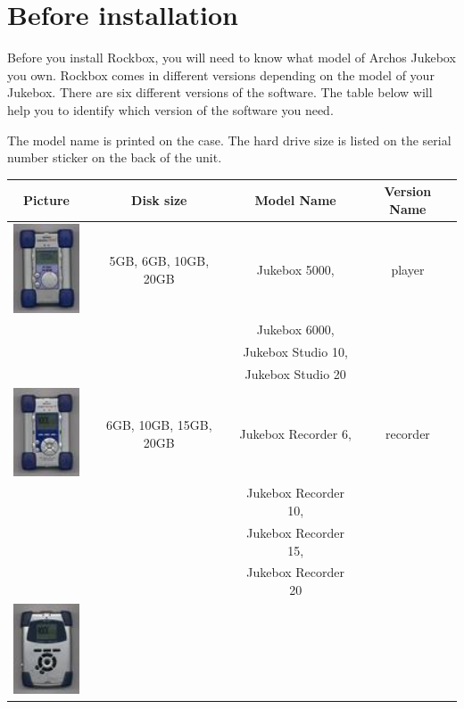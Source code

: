 \section{Before installation}

Before you install Rockbox, you will need to know what model of Archos
Jukebox you own.  Rockbox comes in different versions depending on the
model of your Jukebox.  There are six different versions of the
software.  The table below will help you to identify which version of
the software you need.  

The model name is printed on the case.  The hard drive size is listed on
the serial number sticker on the back of the unit.

\begin{center}
  \begin{tabular}{@{}cccc@{}}\toprule
    \label{ref:Jukeboxtypetable}
    \textbf{Picture} & \textbf{Disk size} & \textbf{Model Name} & \textbf{Version Name} \\\midrule
    \includegraphics[width=2cm]{getting_started/images/archos-studio-small.png} & 5GB, 6GB, 10GB, 20GB & Jukebox 5000, & player\\
    & & Jukebox 6000, & \\
    & & Jukebox Studio 10, & \\
    & & Jukebox Studio 20 & \\\midrule
    \includegraphics[width=2cm]{getting_started/images/archos-recorder-small.png} & 6GB, 10GB, 15GB, 20GB & Jukebox Recorder 6, & recorder\\
    & & Jukebox Recorder 10, & \\
    & & Jukebox Recorder 15, & \\
    & & Jukebox Recorder 20 & \\\midrule
    \includegraphics[width=2cm]{getting_started/images/archos-recorderv2-small.png}

\end{tabular}
\end{center}

